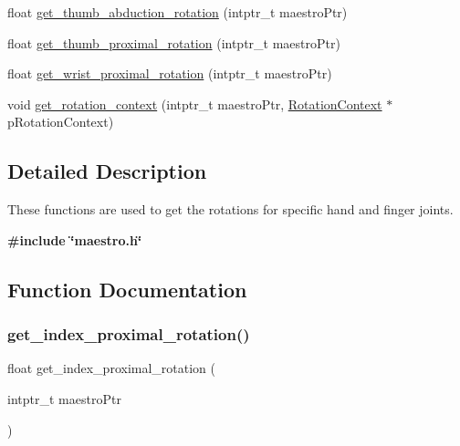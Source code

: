\begin{DoxyCompactItemize}
float \hyperlink{group__rotation_access_ga2dddb1473cdf463238904595e309938f}{get\+\_\+thumb\+\_\+abduction\+\_\+rotation} (intptr\+\_\+t maestro\+Ptr)
\item 
float \hyperlink{group__rotation_access_gafc4acff90b0a11899e18ab2212ec6ce2}{get\+\_\+thumb\+\_\+proximal\+\_\+rotation} (intptr\+\_\+t maestro\+Ptr)
\item 
float \hyperlink{group__rotation_access_ga155f18439d7b43c1722b035fc38a3225}{get\+\_\+wrist\+\_\+proximal\+\_\+rotation} (intptr\+\_\+t maestro\+Ptr)
\item 
void \hyperlink{group__rotation_access_gaebc91ec820b72decfafe94a3fa34974d}{get\+\_\+rotation\+\_\+context} (intptr\+\_\+t maestro\+Ptr, \hyperlink{struct_rotation_context}{Rotation\+Context} $\ast$p\+Rotation\+Context)
\end{DoxyCompactItemize}


\subsection{Detailed Description}
These functions are used to get the rotations for specific hand and finger joints. 

{\bfseries {\ttfamily \#include \char`\"{}maestro.\+h\char`\"{}}} 

\subsection{Function Documentation}
\mbox{\label{group__rotation_access_ga7d2da9a343911275b4343c2904c0f92a}} 
\subsubsection{\texorpdfstring{get\+\_\+index\+\_\+proximal\+\_\+rotation()}{get\_index\_proximal\_rotation()}}
{\footnotesize\ttfamily float get\+\_\+index\+\_\+proximal\+\_\+rotation (\begin{DoxyParamCaption}\item[{intptr\+\_\+t}]{maestro\+Ptr }\end{DoxyParamCaption})}


